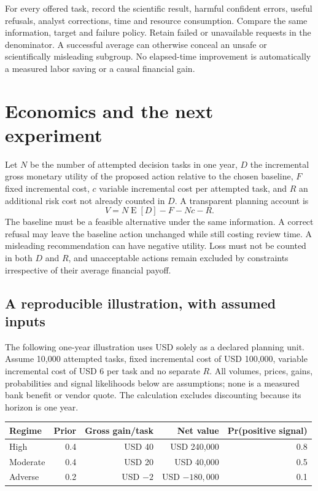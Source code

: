 For every offered task, record the scientific result, harmful confident
errors, useful refusals, analyst corrections, time and resource
consumption. Compare the same information, target and failure policy.
Retain failed or unavailable requests in the denominator. A successful
average can otherwise conceal an unsafe or scientifically misleading
subgroup. No elapsed-time improvement is automatically a measured labor
saving or a causal financial gain. \citep{sp13_economics}

\hypertarget{economics-and-the-next-experiment}{%
\section{Economics and the next
experiment}\label{economics-and-the-next-experiment}}

Let \(N\) be the number of attempted decision tasks in one year, \(D\)
the incremental gross monetary utility of the proposed action relative
to the chosen baseline, \(F\) fixed incremental cost, \(c\) variable
incremental cost per attempted task, and \(R\) an additional risk cost
not already counted in \(D\). A transparent planning account is \[
 V=N\operatorname{E}[D]-F-Nc-R.
\] The baseline must be a feasible alternative under the same
information. A correct refusal may leave the baseline action unchanged
while still costing review time. A misleading recommendation can have
negative utility. Loss must not be counted in both \(D\) and \(R\), and
unacceptable actions remain excluded by constraints irrespective of
their average financial payoff. \citep{sp13_economics}

\hypertarget{a-reproducible-illustration-with-assumed-inputs}{%
\subsection{A reproducible illustration, with assumed
inputs}\label{a-reproducible-illustration-with-assumed-inputs}}

The following one-year illustration uses USD solely as a declared
planning unit. Assume 10,000 attempted tasks, fixed incremental cost of
USD 100,000, variable incremental cost of USD 6 per task and no separate
\(R\). All volumes, prices, gains, probabilities and signal likelihoods
below are assumptions; none is a measured bank benefit or vendor quote.
The calculation excludes discounting because its horizon is one year.
\citep{sp13_economics}

\begin{center}
\begin{tabular}{@{}lrrrr@{}}
\toprule
Regime & Prior & Gross gain/task & Net value & Pr(positive signal) \\
\midrule
High & 0.4 & USD 40 & USD 240,000 & 0.8 \\
Moderate & 0.4 & USD 20 & USD 40,000 & 0.5 \\
Adverse & 0.2 & USD $-2$ & USD $-180,000$ & 0.1 \\
\bottomrule
\end{tabular}
\end{center}

